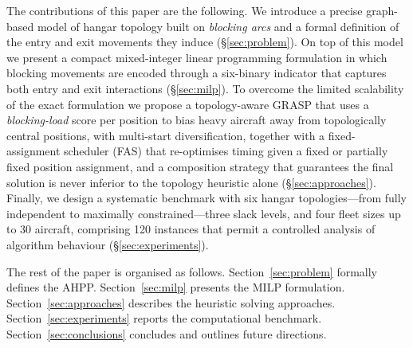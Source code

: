 The contributions of this paper are the following.  We introduce a precise
graph-based model of hangar topology built on \emph{blocking arcs} and a
formal definition of the entry and exit movements they induce
(\S\ref{sec:problem}).  On top of this model we present a compact
mixed-integer linear programming formulation in which blocking movements
are encoded through a six-binary indicator that captures both entry and
exit interactions (\S\ref{sec:milp}).  To overcome the limited scalability
of the exact formulation we propose a topology-aware GRASP that uses a
\emph{blocking-load} score per position to bias heavy aircraft away from
topologically central positions, with multi-start diversification, together
with a fixed-assignment scheduler (FAS) that re-optimises timing given a
fixed or partially fixed position assignment, and a composition strategy
that guarantees the final solution is never inferior to the topology
heuristic alone (\S\ref{sec:approaches}).  Finally, we design a systematic
benchmark with six hangar topologies---from fully independent to maximally
constrained---three slack levels, and four fleet sizes up to 30 aircraft,
comprising 120 instances that permit a controlled analysis of algorithm
behaviour (\S\ref{sec:experiments}).

The rest of the paper is organised as follows.
Section~\ref{sec:problem} formally defines the AHPP.
Section~\ref{sec:milp} presents the MILP formulation.
Section~\ref{sec:approaches} describes the heuristic solving approaches.
Section~\ref{sec:experiments} reports the computational benchmark.
Section~\ref{sec:conclusions} concludes and outlines future directions.
